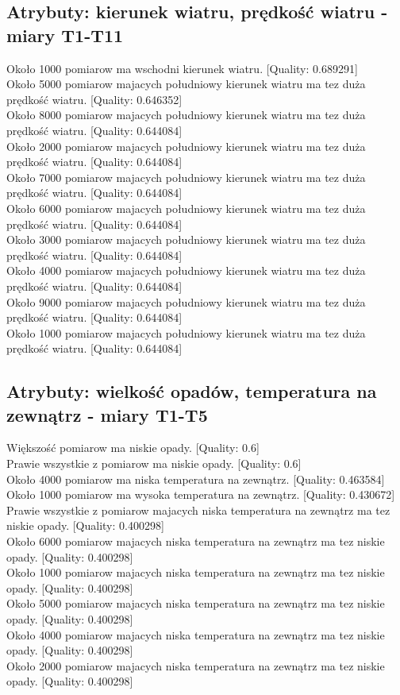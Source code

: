 \documentclass{classrep}
\begin{document}
\subsection{Atrybuty: kierunek wiatru, prędkość wiatru - miary T1-T11}
Około 1000 pomiarow ma wschodni kierunek wiatru. [Quality: 0.689291]\\
Około 5000 pomiarow majacych południowy kierunek wiatru ma tez duża prędkość wiatru. [Quality: 0.646352]\\
Około 8000 pomiarow majacych południowy kierunek wiatru ma tez duża prędkość wiatru. [Quality: 0.644084]\\
Około 2000 pomiarow majacych południowy kierunek wiatru ma tez duża prędkość wiatru. [Quality: 0.644084]\\
Około 7000 pomiarow majacych południowy kierunek wiatru ma tez duża prędkość wiatru. [Quality: 0.644084]\\
Około 6000 pomiarow majacych południowy kierunek wiatru ma tez duża prędkość wiatru. [Quality: 0.644084]\\
Około 3000 pomiarow majacych południowy kierunek wiatru ma tez duża prędkość wiatru. [Quality: 0.644084]\\
Około 4000 pomiarow majacych południowy kierunek wiatru ma tez duża prędkość wiatru. [Quality: 0.644084]\\
Około 9000 pomiarow majacych południowy kierunek wiatru ma tez duża prędkość wiatru. [Quality: 0.644084]\\
Około 1000 pomiarow majacych południowy kierunek wiatru ma tez duża prędkość wiatru. [Quality: 0.644084]\\

\subsection{Atrybuty: wielkość opadów, temperatura na zewnątrz - miary T1-T5}
Większość pomiarow ma niskie opady. [Quality: 0.6]\\
Prawie wszystkie z pomiarow ma niskie opady. [Quality: 0.6]\\
Około 4000 pomiarow ma niska temperatura na zewnątrz. [Quality: 0.463584]\\
Około 1000 pomiarow ma wysoka temperatura na zewnątrz. [Quality: 0.430672]\\
Prawie wszystkie z pomiarow majacych niska temperatura na zewnątrz ma tez niskie opady. [Quality: 0.400298]\\
Około 6000 pomiarow majacych niska temperatura na zewnątrz ma tez niskie opady. [Quality: 0.400298]\\
Około 1000 pomiarow majacych niska temperatura na zewnątrz ma tez niskie opady. [Quality: 0.400298]\\
Około 5000 pomiarow majacych niska temperatura na zewnątrz ma tez niskie opady. [Quality: 0.400298]\\
Około 4000 pomiarow majacych niska temperatura na zewnątrz ma tez niskie opady. [Quality: 0.400298]\\
Około 2000 pomiarow majacych niska temperatura na zewnątrz ma tez niskie opady. [Quality: 0.400298]\\
\end{document}
